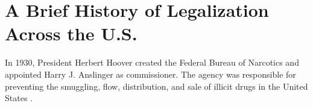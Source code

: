 



%

%


\section{A Brief History of Legalization Across the U.S.}

In 1930, President Herbert Hoover created the Federal Bureau of Narcotics and appointed Harry J. Anslinger as commissioner. The agency was responsible for preventing the smuggling, flow, distribution, and sale of illicit drugs in the United States \citep{hari_2015,mosher_and_akins_2019,newhart_and_dolphin_2018,rosenthal_and_kubby_1996}. 

